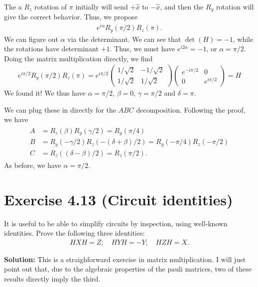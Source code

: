 \documentclass{book}
\begin{document}
    The a $R_z$ rotation of $\pi$ initially will send $+\hat{x}$ to $-\hat{x}$, and then the $R_y$ rotation will give the correct behavior. Thus, we propose
    \begin{align}
        e^{i\alpha} R_y(\pi/2) R_z(\pi).
    \end{align}
    We can figure out $\alpha$ via the determinant. We can see that $\det(H) = -1$, while the rotations have determinant $+1$. Thus, we must have $e^{i2\alpha} = -1$, or $\alpha = \pi/2$. Doing the matrix multiplication directly, we find
    \begin{align}
        e^{i\pi/2} R_y (\pi/2) R_z(\pi) = e^{i\pi/2} \begin{pmatrix}
            1/\sqrt{2} & -1/\sqrt{2} \\
            1/\sqrt{2} & 1/\sqrt{2}
        \end{pmatrix} \begin{pmatrix}
            e^{-i\pi/2} & 0 \\
            0 & e^{i\pi/2}
        \end{pmatrix} = H
    \end{align}
    We found it! We thus have $\alpha = \pi/2$, $\beta = 0$, $\gamma = \pi/2$ and $\delta = \pi$.

    We can plug these in directly for the $ABC$ decomposition. Following the proof, we have
    \begin{align}
    \begin{aligned}
        A &= R_z(\beta) R_y(\gamma/2) = R_y(\pi/4) \\
        B &= R_y(-\gamma/2) R_z(-(\delta + \beta)/2) = R_y(-\pi/4)R_z(-\pi/2)\\
        C &= R_z((\delta - \beta)/2) = R_z(\pi/2).
    \end{aligned}
    \end{align}
    As before, we have $\alpha = \pi/2$.

\section*{Exercise 4.13 (Circuit identities)}
    It is useful to be able to simplify circuits by inspection, using well-known identities. Prove the following three identities:
    \begin{align}
        HXH = Z;\quad HYH = -Y; \quad HZH = X.
    \end{align}

    \textbf{Solution:} This is a straighforward exercise in matrix multiplication. I will just point out that, due to the algebraic properties of the pauli matrices, two of these results directly imply the third. 
\end{document}
